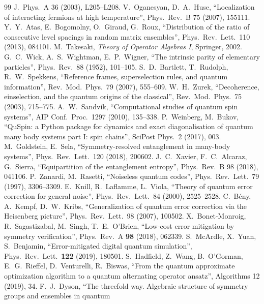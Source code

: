\documentclass[11pt]{article}
\begin{document}
{\begin{thebibliography}{99}
  J.\ Phys.\ A 36 (2003), L205--L208.
 V.~Oganesyan, D.~A.~Huse, ``Localization of interacting fermions at high temperature'',
  Phys.\ Rev.\ B 75 (2007), 155111.
 Y.~Y.~Atas, E.~Bogomolny, O.~Giraud, G.~Roux, ``Distribution of the ratio of consecutive
  level spacings in random matrix ensembles'', Phys.\ Rev.\ Lett.\ 110 (2013), 084101.
 M.~Takesaki, \emph{Theory of Operator Algebras I}, Springer, 2002.
 G.~C.~Wick, A.~S.~Wightman, E.~P.~Wigner, ``The intrinsic parity of elementary particles'',
  Phys.\ Rev.\ 88 (1952), 101--105.
 S.~D.~Bartlett, T.~Rudolph, R.~W.~Spekkens, ``Reference frames, superselection rules, and
  quantum information'', Rev.\ Mod.\ Phys.\ 79 (2007), 555--609.
 W.~H.~Zurek, ``Decoherence, einselection, and the quantum origins of the classical'',
  Rev.\ Mod.\ Phys.\ 75 (2003), 715--775.
 A.~W.~Sandvik, ``Computational studies of quantum spin systems'', AIP Conf.\ Proc.\ 1297
  (2010), 135--338.
 P.~Weinberg, M.~Bukov, ``QuSpin: a Python package for dynamics and exact diagonalisation of
  quantum many body systems part I: spin chains'', SciPost Phys.\ 2 (2017), 003.
 M.~Goldstein, E.~Sela, ``Symmetry-resolved entanglement in many-body systems'',
  Phys.\ Rev.\ Lett.\ 120 (2018), 200602.
 J.~C.~Xavier, F.~C.~Alcaraz, G.~Sierra, ``Equipartition of the entanglement entropy'',
  Phys.\ Rev.\ B 98 (2018), 041106.
 P.~Zanardi, M.~Rasetti, ``Noiseless quantum codes'', Phys.\ Rev.\ Lett.\ 79 (1997), 3306--3309.
 E.~Knill, R.~Laflamme, L.~Viola, ``Theory of quantum error correction for general noise'',
  Phys.\ Rev.\ Lett.\ 84 (2000), 2525--2528.
 C.~B\'eny, A.~Kempf, D.~W.~Kribs, ``Generalization of quantum error correction via the Heisenberg
  picture'', Phys.\ Rev.\ Lett.\ 98 (2007), 100502.
 X.~Bonet-Monroig, R.~Sagastizabal, M.~Singh, T.~E.~O'Brien, ``Low-cost error mitigation
by symmetry verification'', Phys.\ Rev.\ A \textbf{98} (2018), 062339.
 S.~McArdle, X.~Yuan, S.~Benjamin, ``Error-mitigated digital quantum simulation'', Phys.\ Rev.\
Lett.\ \textbf{122} (2019), 180501.
 S.~Hadfield, Z.~Wang, B.~O'Gorman, E.~G.~Rieffel, D.~Venturelli, R.~Biswas, ``From the quantum
  approximate optimization algorithm to a quantum alternating operator ansatz'', Algorithms 12 (2019), 34.
\bibitem{dyson1962} F.~J.~Dyson, ``The threefold way. Algebraic structure of symmetry groups and ensembles in quantum

\end{thebibliography}}
\end{document}
